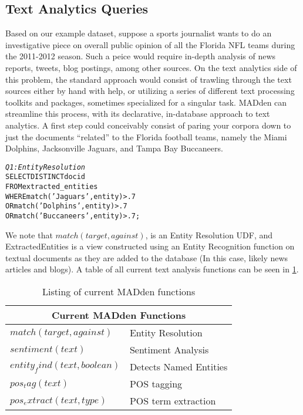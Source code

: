 \subsection{Text Analytics Queries}
Based on our example dataset, suppose a sports journalist
wants to do an investigative piece on overall public opinion 
of all the Florida NFL teams during the 2011-2012 season. 
Such a peice would require in-depth analysis of news reports,
tweets, blog postings, among other sources. On the text
analytics side of this problem, the standard approach would
consist of trawling through the text sources either by hand
with help, or utilizing a series of different text processing
toolkits and packages, sometimes specialized for a singular 
task. MADden can streamline this process, with its declarative,
in-database approach to text analytics. A first step could 
conceivably consist of paring your corpora down to just
the documents ``related'' to the Florida football teams, namely
the Miami Dolphins, Jacksonville Jaguars, and Tampa Bay Buccaneers. 

\begin{small}
\begin{alltt}
\textit{Q1: Entity Resolution}
SELECT DISTINCT docid
FROM extracted_entities
WHERE match('Jaguars', entity) > .7
   OR match('Dolphins', entity) > .7
   OR match('Buccaneers', entity) > .7;
\end{alltt}
\end{small}


We note that $match(target, against)$, is an Entity
Resolution UDF, and ExtractedEntities is a view constructed 
using an Entity Recognition function on textual documents as they
are added to the database (In this case, likely news articles and blogs). A
table of all current text analysis functions can be seen in
\ref{tab:madfunct}.\\

\begin{table}
\begin{center}
\begin{tabular}{|l|l|}
\hline
\multicolumn{2}{|c|}{Current MADden Functions}\\
\hline
$match(target, against)$ & Entity Resolution\\
\hline
$sentiment(text)$ & Sentiment Analysis\\
\hline
$entity_find(text, boolean)$ & Detects Named Entities\\
\hline
$pos_tag(text)$ & POS tagging\\
\hline
$pos_extract(text, type)$ & POS term extraction \\
\hline
\end{tabular}
\end{center}
\caption{Listing of current MADden functions}
\label{tab:madfunct}
\end{table}

